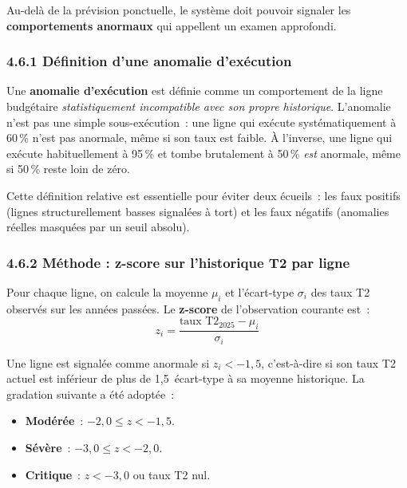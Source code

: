 Au-del\`a de la pr\'evision ponctuelle, le syst\`eme doit pouvoir signaler les
\textbf{comportements anormaux} qui appellent un examen approfondi.

\subsubsection*{4.6.1 \quad D\'efinition d'une anomalie d'ex\'ecution}

Une \textbf{anomalie d'ex\'ecution} est d\'efinie comme un comportement de la ligne
budg\'etaire \textit{statistiquement incompatible avec son propre historique}.
L'anomalie n'est pas une simple sous-ex\'ecution~: une ligne qui ex\'ecute syst\'ematiquement
\`a 60\,\% n'est pas anormale, m\^eme si son taux est faible. \`A l'inverse, une ligne
qui ex\'ecute habituellement \`a 95\,\% et tombe brutalement \`a 50\,\% \emph{est}
anormale, m\^eme si 50\,\% reste loin de z\'ero.

Cette d\'efinition relative est essentielle pour \'eviter deux \'ecueils~: les
faux positifs (lignes structurellement basses signal\'ees \`a tort) et les faux
n\'egatifs (anomalies r\'eelles masqu\'ees par un seuil absolu).

\subsubsection*{4.6.2 \quad M\'ethode : z-score sur l'historique T2 par ligne}

Pour chaque ligne, on calcule la moyenne $\mu_i$ et l'\'ecart-type $\sigma_i$ des
taux T2 observ\'es sur les ann\'ees pass\'ees. Le \textbf{z-score} de l'observation
courante est~:
$$
z_i = \frac{\text{taux T2}_{2025} - \mu_i}{\sigma_i}
$$

\noindent
Une ligne est signal\'ee comme anormale si $z_i < -1{,}5$, c'est-\`a-dire si son
taux T2 actuel est inf\'erieur de plus de 1{,}5~\'ecart-type \`a sa moyenne historique.
La gradation suivante a \'et\'e adopt\'ee~:

\begin{itemize}
    \item \textbf{Mod\'er\'ee}~: $-2{,}0 \leq z < -1{,}5$.
    \item \textbf{S\'ev\`ere}~: $-3{,}0 \leq z < -2{,}0$.
    \item \textbf{Critique}~: $z < -3{,}0$ ou taux T2 nul.
\end{itemize}

